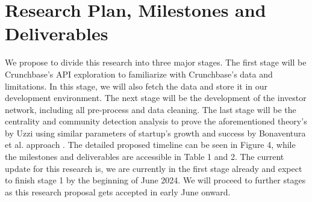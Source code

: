 \documentclass[a4paper,11pt]{article}
\begin{document}
\section{Research Plan, Milestones and Deliverables}

We propose to divide this research into three major stages. The first stage will be Crunchbase's API exploration to familiarize with Crunchbase's data and limitations. In this stage, we will also fetch the data and store it in our development environment. The next stage will be the development of the investor network, including all pre-process and data cleaning. The last stage will be the centrality and community detection analysis to prove the aforementioned theory's by Uzzi \cite{uzzi2021a} using similar parameters of startup's growth and success by Bonaventura et al. approach \cite{bonaventura2020a}. The detailed proposed timeline can be seen in Figure 4, while the milestones and deliverables are accessible in Table 1 and 2. The current update for this research is, we are currently in the first stage already and expect to finish stage 1 by the beginning of June 2024. We will proceed to further stages as this research proposal gets accepted in early June onward.

\end{document}
